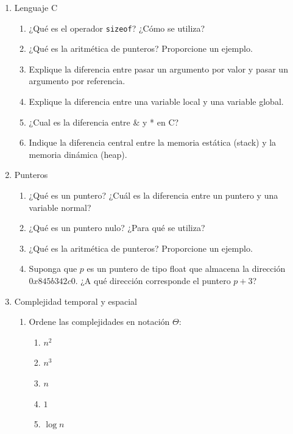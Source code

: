 \documentclass[12pt]{article}
\begin{document}
\begin{titlepage}
        \begin{enumerate}
            \item Lenguaje C
            \begin{enumerate}[label*=\arabic*.]
                \item ¿Qué es el operador \texttt{sizeof}? ¿Cómo se utiliza?
                \item ¿Qué es la aritmética de punteros? Proporcione un ejemplo.
                \item Explique la diferencia entre pasar un argumento por valor y pasar un argumento por referencia.
                \item Explique la diferencia entre una variable local y una variable global.
                \item ¿Cual es la diferencia entre \& y * en C?
                \item Indique la diferencia central entre la memoria estática (stack) y la memoria dinámica (heap).
            \end{enumerate}    
            \item Punteros
            \begin{enumerate}[label*=\arabic*.]
                \item ¿Qué es un puntero? ¿Cuál es la diferencia entre un puntero y una variable normal?
                \item ¿Qué es un puntero nulo? ¿Para qué se utiliza?
                \item ¿Qué es la aritmética de punteros? Proporcione un ejemplo.
                \item Suponga que $p$ es un puntero de tipo float que almacena la dirección $0x845b342c0$. ¿A qué dirección corresponde el puntero $p+3$?
            \end{enumerate}
            \item Complejidad temporal y espacial
            \begin{enumerate}[label*=\arabic*.]
                \item Ordene las complejidades en notación $\Theta$:
                \begin{multicols}{3}
                \begin{enumerate}
                    \item $n^2$
                    \item $n^3$
                    \item $n$
                    \item $1$
                    \item $\log n$

\end{enumerate}
\end{multicols}
\end{enumerate}
\end{enumerate}
\end{titlepage}
\end{document}
